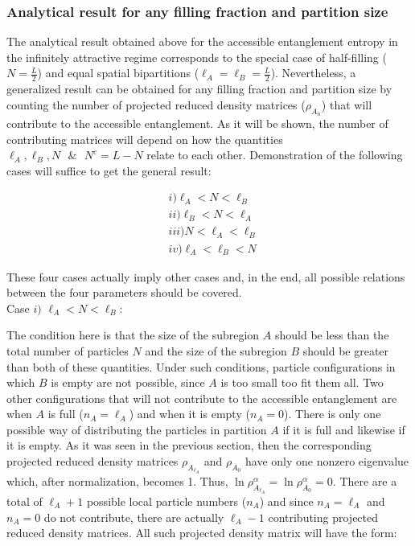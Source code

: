 \subsubsection{Analytical result for any filling fraction and partition size}

The analytical result obtained above for the accessible entanglement entropy in the infinitely attractive regime corresponds to the special case of half-filling ($N = \frac{L}{2}$) and equal spatial bipartitions ($\ell_{A} = \ell_{B} = \frac{L}{2}$). Nevertheless, a generalized result can be obtained for any filling fraction and partition size by counting the number of projected reduced density matrices ($\rho_{A_n}$) that will contribute to the accessible entanglement. As it will be shown, the number of contributing matrices will depend on how the quantities $\ell_{A}, \ell_{B}, N \text{ } \&  \text{ }N^{c} = L-N$ relate to each other. Demonstration of the following cases will suffice to get the general result:

\begin{align}
&i) \ell_{A} < N < \ell_{B} \nonumber \\
&ii) \ell_{B} < N < \ell_{A} \nonumber \\
&iii)  N < \ell_{A} < \ell_{B} \nonumber \\
&iv) \ell_{A} < \ell_{B} < N \nonumber
\end{align}

These four cases actually imply other cases and, in the end, all possible relations between the four parameters should be covered. \\

Case $i)$ $\ell_{A} < N < \ell_{B}$:

The condition here is that the size of the subregion $A$ should be less than the total number of particles $N$ and the size of the subregion $B$ should be greater than both of these quantities. Under such conditions, particle configurations in which $B$ is empty are not possible, since $A$ is too small too fit them all. Two other configurations that will not contribute to the accessible entanglement are when $A$ is full ($n_{A} = \ell_{A}$) and when it is empty ($n_{A} = 0$). There is only one possible way of distributing the particles in partition $A$ if it is full and likewise if it is empty. As it was seen in the previous section, then the corresponding projected reduced density matrices $\rho_{A_{\ell_{A}}}$ and $\rho_{A_0}$ have only one nonzero eigenvalue which, after normalization, becomes 1. Thus, $\ln \rho_{A_{\ell_{A}}}^{\alpha} = \ln \rho_{A_0}^{\alpha} = 0$. There are a total of $\ell_{A}+1$ possible local particle numbers ($n_{A}$) and since $n_{A} = \ell_{A}$ and $n_{A} = 0$ do not contribute, there are actually $\ell_{A}-1$ contributing projected reduced density matrices. All such projected density matrix will have the form:

